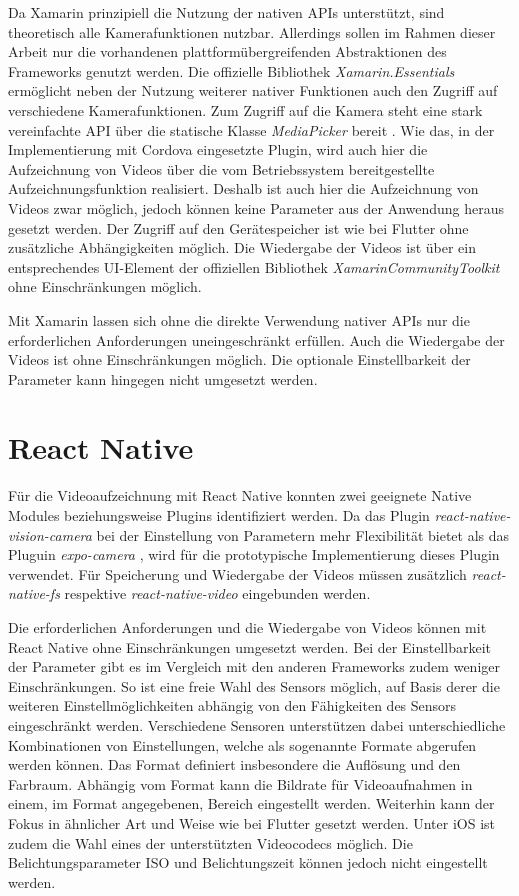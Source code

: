 Da Xamarin prinzipiell die Nutzung der nativen \acp{API} unterstützt, sind theoretisch alle Kamerafunktionen nutzbar.
Allerdings sollen im Rahmen dieser Arbeit nur die vorhandenen plattformübergreifenden Abstraktionen des Frameworks genutzt werden.
Die offizielle Bibliothek \textit{Xamarin.Essentials} ermöglicht neben der Nutzung weiterer nativer Funktionen auch den Zugriff auf verschiedene Kamerafunktionen.
Zum Zugriff auf die Kamera steht eine stark vereinfachte \ac{API} über die statische Klasse \textit{MediaPicker} bereit \cite{Xamarin_MediaPicker}.
Wie das, in der Implementierung mit Cordova eingesetzte Plugin, wird auch hier die Aufzeichnung von Videos über die vom Betriebssystem bereitgestellte Aufzeichnungsfunktion realisiert.
Deshalb ist auch hier die Aufzeichnung von Videos zwar möglich, jedoch können keine Parameter aus der Anwendung heraus gesetzt werden.
Der Zugriff auf den Gerätespeicher ist wie bei Flutter ohne zusätzliche Abhängigkeiten möglich.
Die Wiedergabe der Videos ist über ein entsprechendes \ac{UI}-Element der offiziellen Bibliothek \textit{XamarinCommunityToolkit} \cite{Xamarin_CommunityToolkit} ohne Einschränkungen möglich.

Mit Xamarin lassen sich ohne die direkte Verwendung nativer \acp{API} nur die erforderlichen Anforderungen uneingeschränkt erfüllen.
Auch die Wiedergabe der Videos ist ohne Einschränkungen möglich.
Die optionale Einstellbarkeit der Parameter kann hingegen nicht umgesetzt werden.


\section{React Native}
\label{sec:Evaulation_ReactNative}

Für die Videoaufzeichnung mit React Native konnten zwei geeignete Native Modules beziehungsweise Plugins identifiziert werden.
Da das Plugin \textit{react-native-vision-camera} \cite{Vision_Canmera} bei der Einstellung von Parametern mehr Flexibilität bietet als das Pluguin \textit{expo-camera} \cite{Expo_Camera}, wird für die prototypische Implementierung dieses Plugin verwendet.
Für Speicherung und Wiedergabe der Videos müssen zusätzlich \textit{react-native-fs} \cite{ReactNative_FileSystem} respektive \textit{react-native-video} \cite{ReactNative_Video} eingebunden werden.

Die erforderlichen Anforderungen und die Wiedergabe von Videos können mit React Native ohne Einschränkungen umgesetzt werden.
Bei der Einstellbarkeit der Parameter gibt es im Vergleich mit den anderen Frameworks zudem weniger Einschränkungen.
So ist eine freie Wahl des Sensors möglich, auf Basis derer die weiteren Einstellmöglichkeiten abhängig von den Fähigkeiten des Sensors eingeschränkt werden.
Verschiedene Sensoren unterstützen dabei unterschiedliche Kombinationen von Einstellungen, welche als sogenannte Formate abgerufen werden können.
Das Format definiert insbesondere die Auflösung und den Farbraum.
Abhängig vom Format kann die Bildrate für Videoaufnahmen in einem, im Format angegebenen, Bereich eingestellt werden.
Weiterhin kann der Fokus in ähnlicher Art und Weise wie bei Flutter gesetzt werden.
Unter iOS ist zudem die Wahl eines der unterstützten Videocodecs möglich.
Die Belichtungsparameter ISO und Belichtungszeit können jedoch nicht eingestellt werden.
